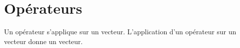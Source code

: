 \section{Opérateurs}

Un opérateur s'applique sur un vecteur. L'application d'un opérateur sur un vecteur donne un vecteur.
